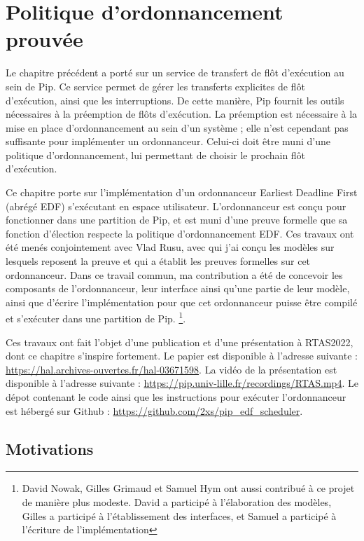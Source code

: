 \chapter{Politique d'ordonnancement prouvée}

	Le chapitre précédent a porté sur un service de transfert de flôt d'exécution au sein de Pip. Ce service permet de gérer les transferts explicites de flôt d'exécution, ainsi que les interruptions. De cette manière, Pip fournit les outils nécessaires à la préemption de flôts d'exécution. La préemption est nécessaire à la mise en place d'ordonnancement au sein d'un système ; elle n'est cependant pas suffisante pour implémenter un ordonnanceur. Celui-ci doit être muni d'une politique d'ordonnancement, lui permettant de choisir le prochain flôt d'exécution.

	Ce chapitre porte sur l'implémentation d'un ordonnanceur Earliest Deadline First (abrégé EDF) s'exécutant en espace utilisateur. L'ordonnanceur est conçu pour fonctionner dans une partition de Pip, et est muni d'une preuve formelle que sa fonction d'élection respecte la politique d'ordonnancement EDF. Ces travaux ont été menés conjointement avec Vlad Rusu, avec qui j'ai conçu les modèles sur lesquels reposent la preuve et qui a établit les preuves formelles sur cet ordonnanceur. Dans ce travail commun, ma contribution a été de concevoir les composants de l'ordonnanceur, leur interface ainsi qu'une partie de leur modèle, ainsi que d'écrire l'implémentation pour que cet ordonnanceur puisse être compilé et s'exécuter dans une partition de Pip.
	\footnote{David Nowak, Gilles Grimaud et Samuel Hym ont aussi contribué à ce projet de manière plus modeste. David a participé à l'élaboration des modèles, Gilles a participé à l'établissement des interfaces, et Samuel a participé à l'écriture de l'implémentation}.
	
	Ces travaux ont fait l'objet d'une publication et d'une présentation à RTAS2022, dont ce chapitre s'inspire fortement. Le papier est disponible à l'adresse suivante : \url{https://hal.archives-ouvertes.fr/hal-03671598}. La vidéo de la présentation est disponible à l'adresse suivante : \url{https://pip.univ-lille.fr/recordings/RTAS.mp4}. Le dépot contenant le code ainsi que les instructions pour exécuter l'ordonnanceur est hébergé sur Github : \url{https://github.com/2xs/pip_edf_scheduler}.

	\section{Motivations}
	
